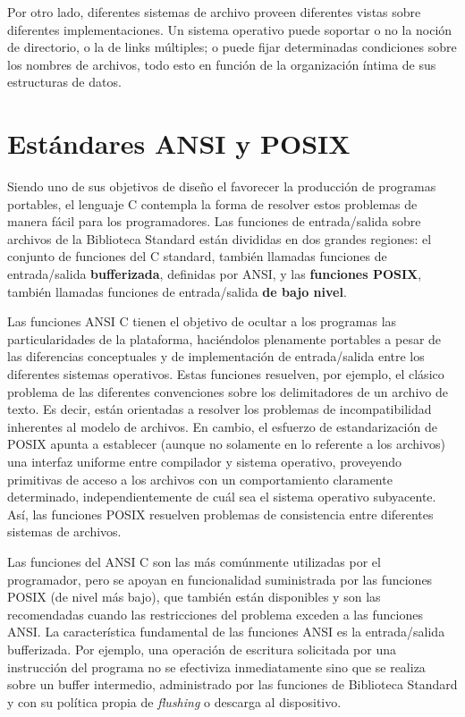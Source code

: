 Por otro lado, diferentes sistemas de archivo proveen diferentes vistas sobre
diferentes implementaciones. Un sistema operativo puede soportar o no la noción
de directorio, o la de links múltiples; o puede fijar determinadas condiciones
sobre los nombres de archivos, todo esto en función de la organización íntima
de sus estructuras de datos.

\section{Estándares ANSI y POSIX}
Siendo uno de sus objetivos de diseño el favorecer la producción de
programas portables, el lenguaje C contempla la forma de resolver estos problemas de
manera fácil para los programadores. Las funciones de entrada/salida sobre
archivos de la Biblioteca Standard están divididas en dos grandes regiones: el
conjunto de funciones del C standard, también llamadas funciones de 
entrada/salida \textbf{bufferizada}, definidas por ANSI, y las 
\textbf{funciones POSIX}, también llamadas
funciones de entrada/salida \textbf{de bajo nivel}.

Las funciones ANSI C tienen el objetivo de ocultar a los programas las
particularidades de la plataforma, haciéndolos plenamente portables a pesar de
las diferencias conceptuales y de implementación de entrada/salida entre los
diferentes sistemas operativos. Estas funciones resuelven, por ejemplo, el
clásico problema de las diferentes convenciones sobre los delimitadores de un
archivo de texto. Es decir, están orientadas a resolver los problemas de
incompatibilidad inherentes al modelo de archivos. En cambio, el esfuerzo de
estandarización de POSIX apunta a establecer (aunque no solamente en lo
referente a los archivos) una interfaz uniforme entre compilador y sistema
operativo, proveyendo primitivas de acceso a los archivos con un comportamiento
claramente determinado, independientemente de cuál sea el sistema operativo
subyacente. Así, las funciones POSIX resuelven problemas de consistencia entre
diferentes sistemas de archivos.

Las funciones del ANSI C son las más comúnmente utilizadas por el programador,
pero se apoyan en funcionalidad suministrada por las funciones POSIX (de nivel
más bajo), que también están disponibles y son las recomendadas cuando las
restricciones del problema exceden a las funciones ANSI. La característica
fundamental de las funciones ANSI es la entrada/salida bufferizada. Por
ejemplo, una operación de escritura solicitada por una instrucción del programa
no se efectiviza inmediatamente sino que se realiza sobre un buffer intermedio,
administrado por las funciones de Biblioteca Standard y con su política propia
de \textit{flushing} o descarga al dispositivo. 

